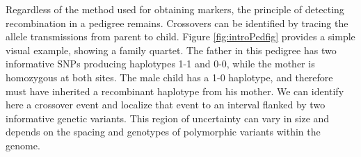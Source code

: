 Regardless of the method used for obtaining markers, the principle of detecting recombination in a pedigree remains.
Crossovers can be identified by tracing the allele transmissions from parent to child.
Figure \ref{fig:introPedfig} provides a simple visual example, showing a family quartet.
The father in this pedigree has two informative SNPs producing haplotypes 1-1 and 0-0, while the mother is homozygous at both sites.
The male child has a 1-0 haplotype, and therefore must have inherited a recombinant haplotype from his mother.
We can identify here a crossover event and localize that event to an interval flanked by two informative genetic variants.
This region of uncertainty can vary in size and depends on the spacing and genotypes of polymorphic variants within the genome.


